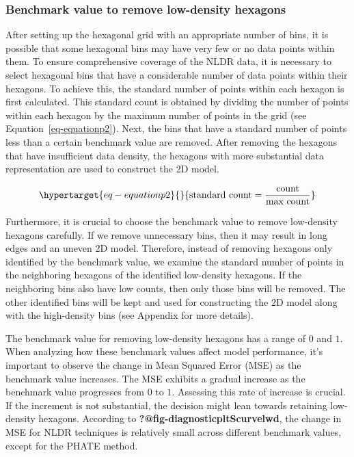 \documentclass[
  12pt]{article}
\begin{document}
\hypertarget{benchmark-value-to-remove-low-density-hexagons}{%
\subsubsection{Benchmark value to remove low-density
hexagons}\label{benchmark-value-to-remove-low-density-hexagons}}

After setting up the hexagonal grid with an appropriate number of bins,
it is possible that some hexagonal bins may have very few or no data
points within them. To ensure comprehensive coverage of the NLDR data,
it is necessary to select hexagonal bins that have a considerable number
of data points within their hexagons. To achieve this, the standard
number of points within each hexagon is first calculated. This standard
count is obtained by dividing the number of points within each hexagon
by the maximum number of points in the grid (see
Equation~\ref{eq-equationp2}). Next, the bins that have a standard
number of points less than a certain benchmark value are removed. After
removing the hexagons that have insufficient data density, the hexagons
with more substantial data representation are used to construct the 2D
model.

\begin{equation}\protect\hypertarget{eq-equationp2}{}{
\text{standard count} = \frac{\text{count}}{\text{max count}} 
}\label{eq-equationp2}\end{equation}

Furthermore, it is crucial to choose the benchmark value to remove
low-density hexagons carefully. If we remove unnecessary bins, then it
may result in long edges and an uneven 2D model. Therefore, instead of
removing hexagons only identified by the benchmark value, we examine the
standard number of points in the neighboring hexagons of the identified
low-density hexagons. If the neighboring bins also have low counts, then
only those bins will be removed. The other identified bins will be kept
and used for constructing the 2D model along with the high-density bins
(see Appendix for more details).

The benchmark value for removing low-density hexagons has a range of
\(0\) and \(1\). When analyzing how these benchmark values affect model
performance, it's important to observe the change in Mean Squared Error
(MSE) as the benchmark value increases. The MSE exhibits a gradual
increase as the benchmark value progresses from \(0\) to \(1\).
Assessing this rate of increase is crucial. If the increment is not
substantial, the decision might lean towards retaining low-density
hexagons. According to \textbf{?@fig-diagnosticpltScurvelwd}, the change
in MSE for NLDR techniques is relatively small across different
benchmark values, except for the PHATE method.
\end{document}
